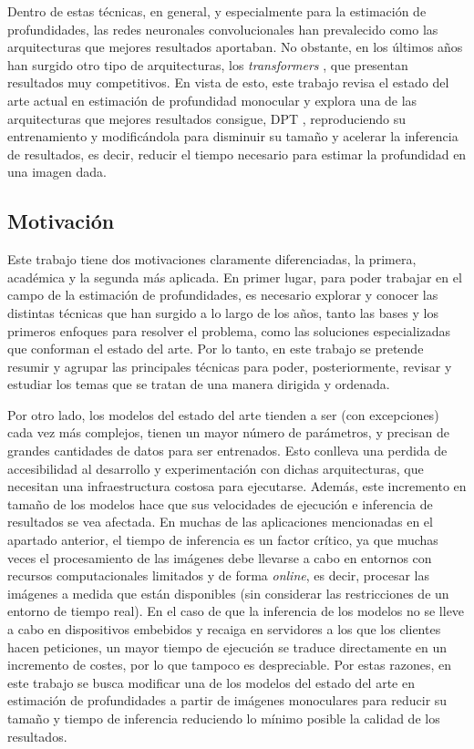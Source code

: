 Dentro de estas técnicas, en general, y especialmente para la estimación de profundidades, las redes neuronales convolucionales han prevalecido como las arquitecturas que mejores resultados aportaban. No obstante, en los últimos años han surgido otro tipo de arquitecturas, los \textit{transformers} \cite{NIPS2017_3f5ee243}, que presentan resultados muy competitivos. En vista de esto, este trabajo revisa el estado del arte actual en estimación de profundidad monocular y explora una de las arquitecturas que mejores resultados consigue, DPT \cite{visiontransformersDPT}, reproduciendo su entrenamiento y modificándola para disminuir su tamaño y acelerar la inferencia de resultados, es decir, reducir el tiempo necesario para estimar la profundidad en una imagen dada. 

\subsection{Motivación}

Este trabajo tiene dos motivaciones claramente diferenciadas, la primera, académica y la segunda más aplicada. En primer lugar, para poder trabajar en el campo de la estimación de profundidades, es necesario explorar y conocer las distintas técnicas que han surgido a lo largo de los años, tanto las bases y los primeros enfoques para resolver el problema, como las soluciones especializadas que conforman el estado del arte. Por lo tanto, en este trabajo se pretende resumir y agrupar las principales técnicas para poder, posteriormente, revisar y estudiar los temas que se tratan de una manera dirigida y ordenada.

Por otro lado, los modelos del estado del arte tienden a ser (con excepciones) cada vez más complejos, tienen un mayor número de parámetros, y precisan de grandes cantidades de datos para ser entrenados. Esto conlleva una perdida de accesibilidad al desarrollo y experimentación con dichas arquitecturas, que necesitan una infraestructura costosa para ejecutarse. Además, este incremento en tamaño de los modelos hace que sus velocidades de ejecución e inferencia de resultados se vea afectada. En muchas de las aplicaciones mencionadas en el apartado anterior, el tiempo de inferencia es un factor crítico, ya que muchas veces el procesamiento de las imágenes debe llevarse a cabo en entornos con recursos computacionales limitados y de forma \textit{online}, es decir, procesar las imágenes a medida que están disponibles (sin considerar las restricciones de un entorno de tiempo real). En el caso de que la inferencia de los modelos no se lleve a cabo en dispositivos embebidos y recaiga en servidores a los que los clientes hacen peticiones, un mayor tiempo de ejecución se traduce directamente en un incremento de costes, por lo que tampoco es despreciable. Por estas razones, en este trabajo se busca modificar una de los modelos del estado del arte en estimación de profundidades a partir de imágenes monoculares para reducir su tamaño y tiempo de inferencia reduciendo lo mínimo posible la calidad de los resultados.

